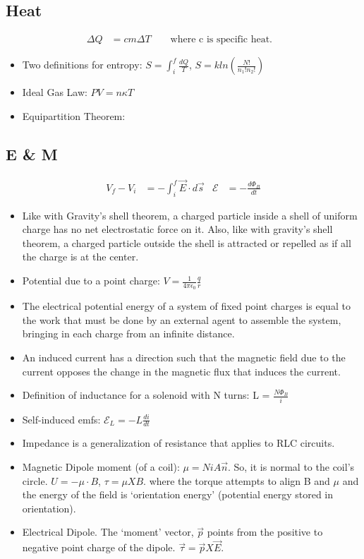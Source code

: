 \documentclass{article}
\begin{document}
    \subsection*{Heat}
        \begin {align*}
        \Delta Q &= cm \Delta T \hspace{2em} \text{where c is specific heat.} &
        \end{align*}
        \begin{itemize}[leftmargin=\lindent]
        \item Two definitions for entropy: $S = \int_i^f \frac{dQ}{T}$, $S = k ln( \frac{N!}{n_1! n_2!} )$
        \item Ideal Gas Law: $P V = n \kappa T$
        \item Equipartition Theorem:
        \end{itemize}
    \subsection*{E \& M}
        \begin{align*}
             V_f - V_i &= - \int_i^f \vec{E} \cdot d\vec{s} & \mathscr{E} &= - \frac{d\Phi_B}{dt}
        \end{align*}
        \begin{itemize}[leftmargin=\lindent]
        \item Like with Gravity's shell theorem, a charged particle inside a shell of uniform charge has no
        net electrostatic force on it. Also, like with gravity's shell theorem, a charged particle outside
        the shell is attracted or repelled as if all the charge is at the center.
        \item Potential due to a point charge: $V = \frac{1}{4 \pi \epsilon_0} \frac{q}{r}$
        \item The electrical potential energy of a system of fixed point charges is equal to the work
        that must be done by an external agent to assemble the system, bringing in each charge
        from an infinite distance.
        \item An induced current has a direction such that the magnetic field due to the current opposes
        the change in the magnetic flux that induces the current.
        \item Definition of inductance for a solenoid with N turns: L = $\frac{N\Phi_B}{i} $
        \item Self-induced emfs: $\mathscr{E}_L = -L \frac{di}{dt}$
        \item Impedance is a generalization of resistance that applies to RLC circuits.
        \item Magnetic Dipole moment (of a coil): $\mu  = N i A \vec{n}$. So, it is normal to the coil's circle.
              $U = - \mu \cdot B$, $\tau = \mu X B$. where the torque attempts to align B and $\mu$ and the
              energy of the field is `orientation energy' (potential energy stored in orientation). 
        \item Electrical Dipole. The `moment' vector, $\vec{p}$ points from the positive to negative point 
        charge of the dipole. $\vec{\tau} = \vec{p} X \vec{E}$.

        \end{itemize}
\end{document}
